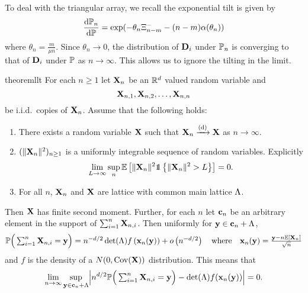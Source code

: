 To deal with the triangular array, we recall the exponential tilt is given by
\begin{equation*}
    \frac{\dif \P_n}{\dif \P} = \exp(
        - \theta_n \Xi^-_{n-m} - (n - m) \alpha(\theta_n)
    )
\end{equation*}
where $\theta_n = \frac{m}{\mu n}$. Since $\theta_n \to 0$, the distribution of $\vD_i$ under $\P_n$ is converging to that of $\vD_i$ under $\P$ as $n \to \infty$. This allows us to ignore the tilting in the limit.

\begin{restatable}{theorem}{llt}
    \label{thm:multi-triangular-llt}
    For each $n \geq 1$ let $\vX_n$ be an $\R^d$ valued random variable and
    \begin{equation*}
        \vX_{n, 1}, \vX_{n, 2}, \ldots, \vX_{n, n}  
    \end{equation*}
    be i.i.d.\ copies of $\vX_n$. Assume that the following holds:
    \begin{enumerate}
        \item There exists a random variable $\vX$ such that $\vX_n \todist \vX$ as $n \to \infty$.
        \item $(\norm{\vX_n}^2)_{n \geq 1}$ is a uniformly integrable sequence of random variables. Explicitly
            \begin{equation}
                \label{eq:ui-condition}
                \lim_{L \to \infty} \sup_n \E\left[
                    \norm{\vX_n}^2
                    \one \left\{ \norm{\vX_n}^2 > L \right\}
                \right] = 0.
            \end{equation}
        \item For all $n$, $\vX_n$ and $\vX$ are lattice with common main lattice $\lattice$.
    \end{enumerate}
    Then $\vX$ has finite second moment. Further, for each $n$ let $\vc_n$ be an arbitrary element in the support of $\sum_{i=1}^n \vX_{n, i}$. Then uniformly for $\vy \in \vc_n + \lattice$,
    \begin{equation*}
        \P\Big(
            \textstyle \sum_{i=1}^n \vX_{n, i} = \vy
        \Big)
        = n^{-d/2} \det(\lattice) f\left( \vx_n(\vy) \right) + \littleo \left( n^{-d/2} \right)
        \quad \text{where} \quad
        \vx_n(\vy) = \frac{\vy - n \E[\vX_n]}{\sqrt{n}}
    \end{equation*}
    and $f$ is the density of a $N(0, \cov(\vX))$ distribution. This means that
    \begin{equation*}
        \lim_{n \to \infty} \sup_{\vy \in \vc_n + \lattice} \abs*{
            n^{d/2} \P\Big( \textstyle \sum_{i=1}^n \vX_{n, i} = \vy \Big)
            - \det(\lattice) f(\vx_n(\vy))
        } = 0.
    \end{equation*}
\end{restatable}

